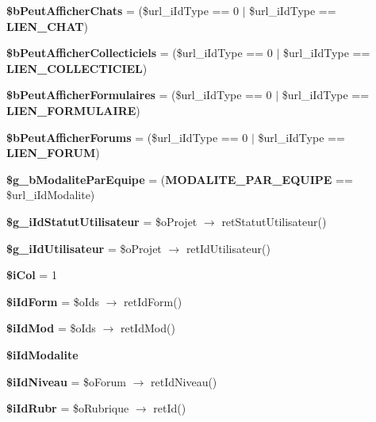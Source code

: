 \begin{CompactItemize}
\item 
\textbf{\$bPeutAfficherChats} = (\$url\_\-iIdType == 0 $|$ \$url\_\-iIdType == {\bf LIEN\_\-CHAT})\label{tableau__bord_8php_1fdf5dde0ad1cdedee25e888af5ec3f6}

\item 
\textbf{\$bPeutAfficherCollecticiels} = (\$url\_\-iIdType == 0 $|$ \$url\_\-iIdType == {\bf LIEN\_\-COLLECTICIEL})\label{tableau__bord_8php_7923ce077d3ce86a52d7824f93c59384}

\item 
\textbf{\$bPeutAfficherFormulaires} = (\$url\_\-iIdType == 0 $|$ \$url\_\-iIdType == {\bf LIEN\_\-FORMULAIRE})\label{tableau__bord_8php_e8616508bab880436d3f973290c0520b}

\item 
\textbf{\$bPeutAfficherForums} = (\$url\_\-iIdType == 0 $|$ \$url\_\-iIdType == {\bf LIEN\_\-FORUM})\label{tableau__bord_8php_d2b4187141781ef1fd2baa4ba092526a}

\item 
\textbf{\$g\_\-bModaliteParEquipe} = ({\bf MODALITE\_\-PAR\_\-EQUIPE} == \$url\_\-iIdModalite)\label{tableau__bord_8php_da761177b2bec00d2b02457a86593c28}

\item 
\textbf{\$g\_\-iIdStatutUtilisateur} = \$oProjet $\rightarrow$ retStatutUtilisateur()\label{tableau__bord_8php_0ba1c61df13b049d1934212b8b0e609c}

\item 
\textbf{\$g\_\-iIdUtilisateur} = \$oProjet $\rightarrow$ retIdUtilisateur()\label{tableau__bord_8php_1ebb3e47a5e19f14b29a1a59acc1ca3f}

\item 
\textbf{\$iCol} = 1\label{tableau__bord_8php_f7defc861bb651b36bedb967e2e33b43}

\item 
\textbf{\$iIdForm} = \$oIds $\rightarrow$ retIdForm()\label{tableau__bord_8php_10bbbf9a09bd557fee247125095711ff}

\item 
\textbf{\$iIdMod} = \$oIds $\rightarrow$ retIdMod()\label{tableau__bord_8php_9572be7281db5b7af02ded5a9a47e2b1}

\item 
\textbf{\$iIdModalite}
\item 
\textbf{\$iIdNiveau} = \$oForum $\rightarrow$ retIdNiveau()\label{tableau__bord_8php_53c16b2aa31a765b4f22041ae2dde3ba}

\item 
\textbf{\$iIdRubr} = \$oRubrique $\rightarrow$ retId()\label{tableau__bord_8php_3abdab7bf509e369e21b6f1668e672eb}


\end{CompactItemize}
